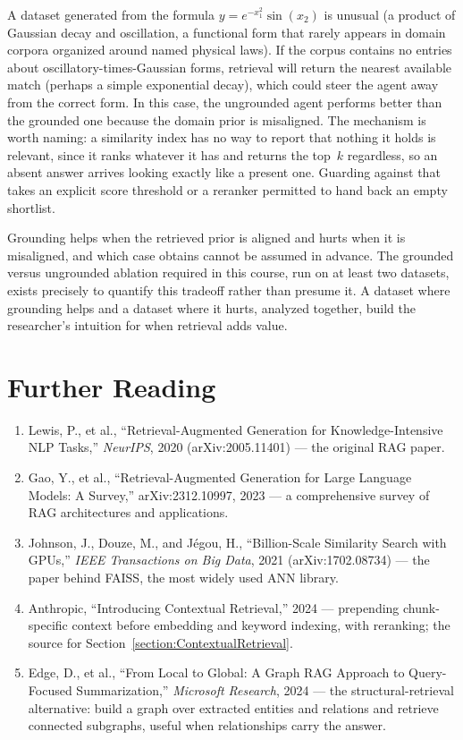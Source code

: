 \begin{example}
A dataset generated from the formula $y = e^{-x_1^2} \sin(x_2)$ is unusual (a product of Gaussian decay and oscillation, a functional form that rarely appears in domain corpora organized around named physical laws).
If the corpus contains no entries about oscillatory-times-Gaussian forms, retrieval will return the nearest available match (perhaps a simple exponential decay), which could steer the agent away from the correct form.
In this case, the ungrounded agent performs better than the grounded one because the domain prior is misaligned.
The mechanism is worth naming: a similarity index has no way to report that nothing it holds is relevant, since it ranks whatever it has and returns the top~$k$ regardless, so an absent answer arrives looking exactly like a present one.
Guarding against that takes an explicit score threshold or a reranker permitted to hand back an empty shortlist.
\end{example}

\begin{remark}
Grounding helps when the retrieved prior is aligned and hurts when it is misaligned, and which case obtains cannot be assumed in advance.
The grounded versus ungrounded ablation required in this course, run on at least two datasets, exists precisely to quantify this tradeoff rather than presume it.
A dataset where grounding helps and a dataset where it hurts, analyzed together, build the researcher's intuition for when retrieval adds value.
\end{remark}

\section*{Further Reading}

\begin{small}
\begin{enumerate}
\item Lewis, P., et al., ``Retrieval-Augmented Generation for Knowledge-Intensive NLP Tasks,'' \emph{NeurIPS}, 2020 (arXiv:2005.11401) — the original RAG paper.
\item Gao, Y., et al., ``Retrieval-Augmented Generation for Large Language Models: A Survey,'' arXiv:2312.10997, 2023 — a comprehensive survey of RAG architectures and applications.
\item Johnson, J., Douze, M., and Jégou, H., ``Billion-Scale Similarity Search with GPUs,'' \emph{IEEE Transactions on Big Data}, 2021 (arXiv:1702.08734) — the paper behind FAISS, the most widely used ANN library.
\item Anthropic, ``Introducing Contextual Retrieval,'' 2024 — prepending chunk-specific context before embedding and keyword indexing, with reranking; the source for Section~\ref{section:ContextualRetrieval}.
\item Edge, D., et al., ``From Local to Global: A Graph RAG Approach to Query-Focused Summarization,'' \emph{Microsoft Research}, 2024 — the structural-retrieval alternative: build a graph over extracted entities and relations and retrieve connected subgraphs, useful when relationships carry the answer.
\end{enumerate}
\end{small}
